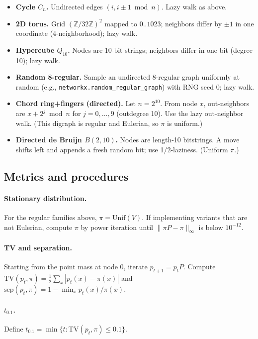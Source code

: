 \documentclass[11pt]{article}
\newcommand{\TV}{\mathrm{TV}}
\newcommand{\Unif}{\mathrm{Unif}}
\begin{document}
\begin{itemize}[leftmargin=1.2em]
\item \textbf{Cycle $C_n$.} Undirected edges $(i,i\pm1\bmod n)$. Lazy walk as above.
\item \textbf{2D torus.} Grid $(\mathbb{Z}/32\mathbb{Z})^2$ mapped to $0..1023$;
neighbors differ by $\pm1$ in one coordinate (4-neighborhood); lazy walk.
\item \textbf{Hypercube $Q_{10}$.} Nodes are 10-bit strings; neighbors differ in
one bit (degree 10); lazy walk.
\item \textbf{Random 8-regular.} Sample an undirected 8-regular graph uniformly
at random (e.g., \texttt{networkx.random\_regular\_graph}) with RNG seed 0; lazy walk.
\item \textbf{Chord ring+fingers (directed).} Let $n=2^{10}$. From node $x$,
out-neighbors are $x+2^j\bmod n$ for $j=0,\dots,9$ (outdegree 10). Use the lazy
out-neighbor walk. (This digraph is regular and Eulerian, so $\pi$ is uniform.)
\item \textbf{Directed de Bruijn $B(2,10)$.} Nodes are length-10 bitstrings.
A move shifts left and appends a fresh random bit; use 1/2-laziness. (Uniform $\pi$.)
\end{itemize}

\subsection{Metrics and procedures}
\paragraph{Stationary distribution.}
For the regular families above, $\pi=\Unif(V)$. If implementing variants that
are not Eulerian, compute $\pi$ by power iteration until $\|\pi P-\pi\|_\infty$
is below $10^{-12}$.

\paragraph{TV and separation.}
Starting from the point mass at node 0, iterate $p_{t+1}=p_t P$.
Compute $\TV(p_t,\pi)=\tfrac12\sum_x|p_t(x)-\pi(x)|$ and
$\mathrm{sep}(p_t,\pi)=1-\min_x p_t(x)/\pi(x)$.

\paragraph{$t_{0.1}$.}
Define $t_{0.1}=\min\{t:\TV(p_t,\pi)\le 0.1\}$.
\end{document}
